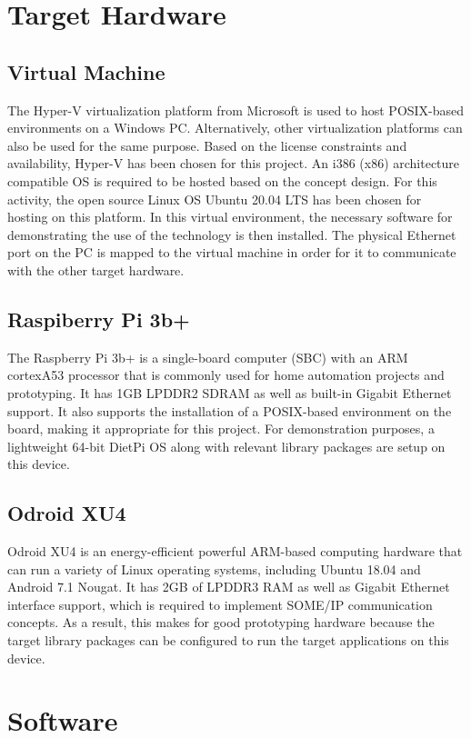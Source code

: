 \section{Target Hardware}
\subsection{Virtual Machine}
The Hyper-V virtualization platform from Microsoft is used to host POSIX-based environments on a Windows PC. Alternatively, other virtualization platforms can also be used for the same purpose. Based on the license constraints and availability, Hyper-V has been chosen for this project.  An i386 (x86) architecture compatible OS is required to be hosted based on the concept design. For this activity, the open source Linux OS Ubuntu 20.04 LTS has been chosen for hosting on this platform. In this virtual environment, the necessary software for demonstrating the use of the technology is then installed. The physical Ethernet port on the PC is mapped to the virtual machine in order for it to communicate with the other target hardware.

\subsection{Raspiberry Pi 3b+}
The Raspberry Pi 3b+ is a single-board computer (SBC) with an ARM cortexA53 processor that is commonly used for home automation projects and prototyping. It has 1GB LPDDR2 SDRAM as well as built-in Gigabit Ethernet support. It also supports the installation of a POSIX-based environment on the board, making it appropriate for this project. For demonstration purposes, a lightweight 64-bit DietPi OS along with relevant library packages are setup on this device.

\subsection{Odroid XU4}
Odroid XU4 is an energy-efficient powerful ARM-based computing hardware that can run a variety of Linux operating systems, including Ubuntu 18.04 and Android 7.1 Nougat. It has 2GB of LPDDR3 RAM as well as Gigabit Ethernet interface support, which is required to implement SOME/IP communication concepts. As a result, this makes for good prototyping hardware because the target library packages can be configured to run the target applications on this device.

\section{Software}
